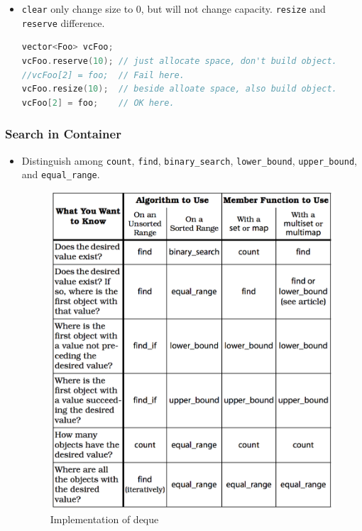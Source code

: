 \documentclass[a4paper,11pt,twoside]{book}
\begin{document}
\begin{itemize}
	\item \texttt{clear} only change size to 0, but will not change capacity. \texttt{resize} and \texttt{reserve} difference.
\begin{lstlisting}[frame=single, language=c++]
vector<Foo> vcFoo;
vcFoo.reserve(10); // just allocate space, don't build object.
//vcFoo[2] = foo;  // Fail here. 
vcFoo.resize(10);  // beside alloate space, also build object.
vcFoo[2] = foo;    // OK here.
\end{lstlisting}	
	
\end{itemize}


\subsubsection{Search in Container}
\begin{itemize}
	\item Distinguish among \texttt{count}, \texttt{find}, \texttt{binary\_search}, \texttt{lower\_bound}, \texttt{upper\_bound}, and \texttt{equal\_range}.

\begin{figure}[ht]
	\centering
	\includegraphics[scale=0.6]{pics/distinguish.png}
	\caption{Implementation of deque}
	\label{fig:queue}
\end{figure}




\end{itemize}
\end{document}

